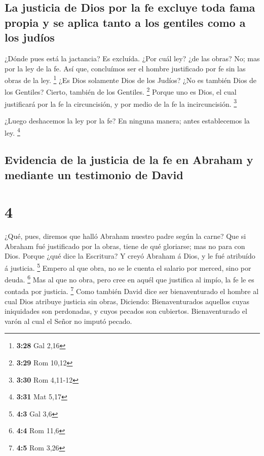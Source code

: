 \hypertarget{la-justicia-de-dios-por-la-fe-excluye-toda-fama-propia-y-se-aplica-tanto-a-los-gentiles-como-a-los-juduxedos}{%
\subsection{La justicia de Dios por la fe excluye toda fama propia y se
aplica tanto a los gentiles como a los
judíos}\label{la-justicia-de-dios-por-la-fe-excluye-toda-fama-propia-y-se-aplica-tanto-a-los-gentiles-como-a-los-juduxedos}}

 ¿Dónde pues está la jactancia? Es excluída. ¿Por cuál ley?
¿de las obras? No; mas por la ley de la fe.  Así que,
concluímos ser el hombre justificado por fe sin las obras de la ley.
\footnote{\textbf{3:28} Gal 2,16}  ¿Es Dios solamente Dios
de los Judíos? ¿No es también Dios de los Gentiles? Cierto, también de
los Gentiles. \footnote{\textbf{3:29} Rom 10,12}  Porque
uno es Dios, el cual justificará por la fe la circuncisión, y por medio
de la fe la incircuncisión. \footnote{\textbf{3:30} Rom 4,11-12}

 ¿Luego deshacemos la ley por la fe? En ninguna manera;
antes establecemos la ley. \footnote{\textbf{3:31} Mat 5,17}

\hypertarget{evidencia-de-la-justicia-de-la-fe-en-abraham-y-mediante-un-testimonio-de-david}{%
\subsection{Evidencia de la justicia de la fe en Abraham y mediante un
testimonio de
David}\label{evidencia-de-la-justicia-de-la-fe-en-abraham-y-mediante-un-testimonio-de-david}}

\hypertarget{section-3}{%
\section{4}\label{section-3}}

 ¿Qué, pues, diremos que halló Abraham nuestro padre según
la carne?  Que si Abraham fué justificado por la obras,
tiene de qué gloriarse; mas no para con Dios.  Porque ¿qué
dice la Escritura? Y creyó Abraham á Dios, y le fué atribuído á
justicia. \footnote{\textbf{4:3} Gal 3,6}  Empero al que
obra, no se le cuenta el salario por merced, sino por deuda. \footnote{\textbf{4:4}
  Rom 11,6}  Mas al que no obra, pero cree en aquél que
justifica al impío, la fe le es contada por justicia. \footnote{\textbf{4:5}
  Rom 3,26}  Como también David dice ser bienaventurado el
hombre al cual Dios atribuye justicia sin obras,  Diciendo:
Bienaventurados aquellos cuyas iniquidades son perdonadas, y cuyos
pecados son cubiertos.  Bienaventurado el varón al cual el
Señor no imputó pecado.

